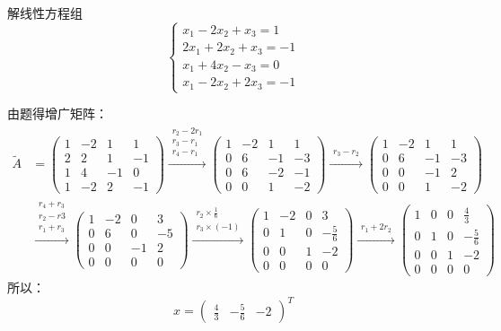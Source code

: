 \documentclass[a4paper]{report}
\begin{document}
\EX 解线性方程组
\begin{equation*}
\begin{cases}
x_1-2x_2+x_3=1\\
2x_1+2x_2+x_3=-1\\
x_1+4x_2-x_3=0\\
x_1-2x_2+2x_3=-1
\end{cases}
\end{equation*}

\begin{jie}
由题得增广矩阵：
\begin{align*}
\widetilde{A}&=
\begin{pmatrix}
1&-2&1&1\\
2&2&1&-1\\
1&4&-1&0\\
1&-2&2&-1
\end{pmatrix}
\xrightarrow{\substack{r_2-2r_1\\ r_3-r_1\\ r_4-r_1}}{
\begin{pmatrix}
1&-2&1&1\\
0&6&-1&-3\\
0&6&-2&-1\\
0&0&1&-2
\end{pmatrix}
}\xrightarrow{\substack{r_3-r_2}}{
\begin{pmatrix}
1&-2&1&1\\
0&6&-1&-3\\
0&0&-1&2\\
0&0&1&-2
\end{pmatrix}
}\\
&\xrightarrow{\substack{r_4+r_3\\ r_2-r3\\ r_1+r_3}}{
\begin{pmatrix}
1&-2&0&3\\
0&6&0&-5\\
0&0&-1&2\\
0&0&0&0
\end{pmatrix}
}\xrightarrow{\substack{r_2\times\frac{1}{6}\\ r_3\times(-1)}}{
\begin{pmatrix}
1&-2&0&3\\
0&1&0&-\frac{5}{6}\\
0&0&1&-2\\
0&0&0&0
\end{pmatrix}
}\xrightarrow{\substack{r_1+2r_2}}{
\begin{pmatrix}
1&0&0&\frac{4}{3}\\
0&1&0&-\frac{5}{6}\\
0&0&1&-2\\
0&0&0&0
\end{pmatrix}
}
\end{align*}
所以：
\begin{equation*}
x=
\begin{pmatrix}
\frac{4}{3}&-\frac{5}{6}&-2
\end{pmatrix}^T
\end{equation*}
\end{jie}
\end{document}
